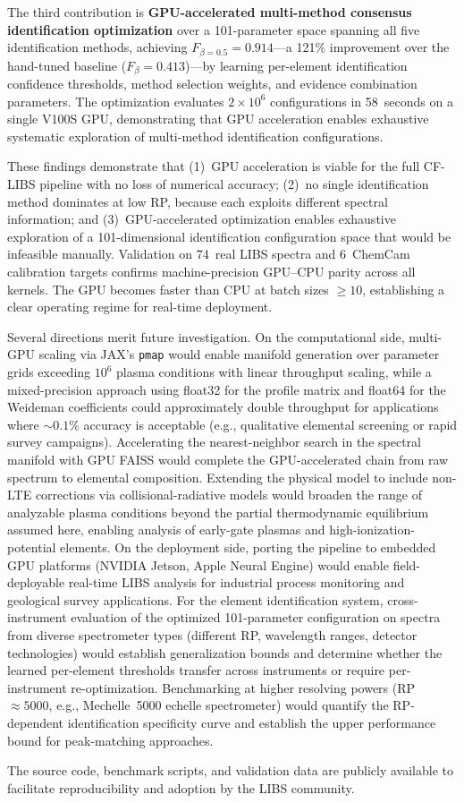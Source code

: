 The third contribution is \textbf{GPU-accelerated multi-method consensus identification optimization} over a 101-parameter space spanning all five identification methods, achieving $F_{\beta=0.5} = 0.914$---a 121\% improvement over the hand-tuned baseline ($F_{\beta} = 0.413$)---by learning per-element identification confidence thresholds, method selection weights, and evidence combination parameters.
The optimization evaluates $2 \times 10^6$ configurations in 58~seconds on a single V100S GPU, demonstrating that GPU acceleration enables exhaustive systematic exploration of multi-method identification configurations.

These findings demonstrate that (1)~GPU acceleration is viable for the full CF-LIBS pipeline with no loss of numerical accuracy; (2)~no single identification method dominates at low RP, because each exploits different spectral information; and (3)~GPU-accelerated optimization enables exhaustive exploration of a 101-dimensional identification configuration space that would be infeasible manually.
Validation on 74~real LIBS spectra and 6~ChemCam calibration targets confirms machine-precision GPU--CPU parity across all kernels.
The GPU becomes faster than CPU at batch sizes $\geq 10$, establishing a clear operating regime for real-time deployment.

Several directions merit future investigation.
On the computational side, multi-GPU scaling via JAX's \texttt{pmap} would enable manifold generation over parameter grids exceeding $10^6$ plasma conditions with linear throughput scaling, while a mixed-precision approach using float32 for the profile matrix and float64 for the Weideman coefficients could approximately double throughput for applications where $\sim 0.1\%$ accuracy is acceptable (e.g., qualitative elemental screening or rapid survey campaigns).
Accelerating the nearest-neighbor search in the spectral manifold with GPU FAISS would complete the GPU-accelerated chain from raw spectrum to elemental composition.
Extending the physical model to include non-LTE corrections via collisional-radiative models would broaden the range of analyzable plasma conditions beyond the partial thermodynamic equilibrium assumed here, enabling analysis of early-gate plasmas and high-ionization-potential elements.
On the deployment side, porting the pipeline to embedded GPU platforms (NVIDIA Jetson, Apple Neural Engine) would enable field-deployable real-time LIBS analysis for industrial process monitoring and geological survey applications.
For the element identification system, cross-instrument evaluation of the optimized 101-parameter configuration on spectra from diverse spectrometer types (different RP, wavelength ranges, detector technologies) would establish generalization bounds and determine whether the learned per-element thresholds transfer across instruments or require per-instrument re-optimization.
Benchmarking at higher resolving powers (RP~$\approx 5000$, e.g., Mechelle~5000 echelle spectrometer) would quantify the RP-dependent identification specificity curve and establish the upper performance bound for peak-matching approaches.

The source code, benchmark scripts, and validation data are publicly available to facilitate reproducibility and adoption by the LIBS community.
